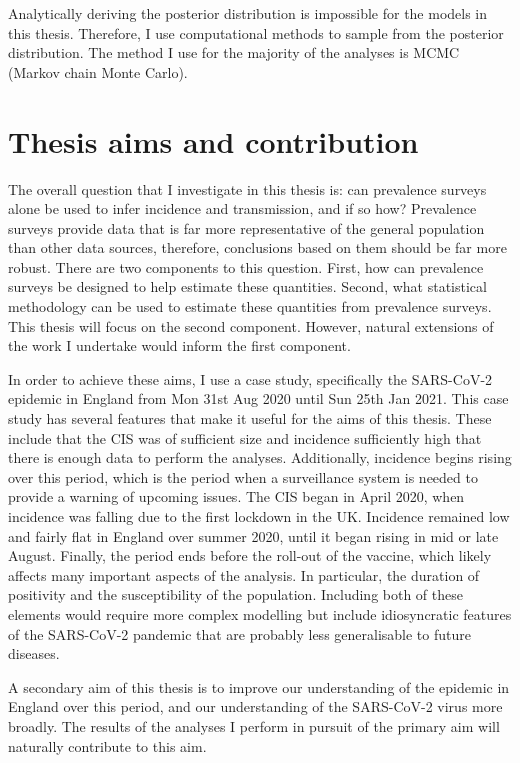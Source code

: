 \documentclass[thesis.tex]{subfiles}
\begin{document}
Analytically deriving the posterior distribution is impossible for the models in this thesis.
Therefore, I use computational methods to sample from the posterior distribution.
The method I use for the majority of the analyses is MCMC (Markov chain Monte Carlo).

\section{Thesis aims and contribution} \label{intro:sec:aims}

The overall question that I investigate in this thesis is: can prevalence surveys alone be used to infer incidence and transmission, and if so how?
Prevalence surveys provide data that is far more representative of the general population than other data sources, therefore, conclusions based on them should be far more robust.
There are two components to this question.
First, how can prevalence surveys be designed to help estimate these quantities.
Second, what statistical methodology can be used to estimate these quantities from prevalence surveys.
This thesis will focus on the second component.
However, natural extensions of the work I undertake would inform the first component.

In order to achieve these aims, I use a case study, specifically the SARS-CoV-2 epidemic in England from Mon 31st Aug 2020 until Sun 25th Jan 2021.
This case study has several features that make it useful for the aims of this thesis.
These include that the CIS was of sufficient size and incidence sufficiently high that there is enough data to perform the analyses.
Additionally, incidence begins rising over this period, which is the period when a surveillance system is needed to provide a warning of upcoming issues.
The CIS began in April 2020, when incidence was falling due to the first lockdown in the UK.
Incidence remained low and fairly flat in England over summer 2020, until it began rising in mid or late August.
Finally, the period ends before the roll-out of the vaccine, which likely affects many important aspects of the analysis.
In particular, the duration of positivity and the susceptibility of the population.
Including both of these elements would require more complex modelling but include idiosyncratic features of the SARS-CoV-2 pandemic that are probably less generalisable to future diseases.

A secondary aim of this thesis is to improve our understanding of the epidemic in England over this period, and our understanding of the SARS-CoV-2 virus more broadly.
The results of the analyses I perform in pursuit of the primary aim will naturally contribute to this aim.
\end{document}
